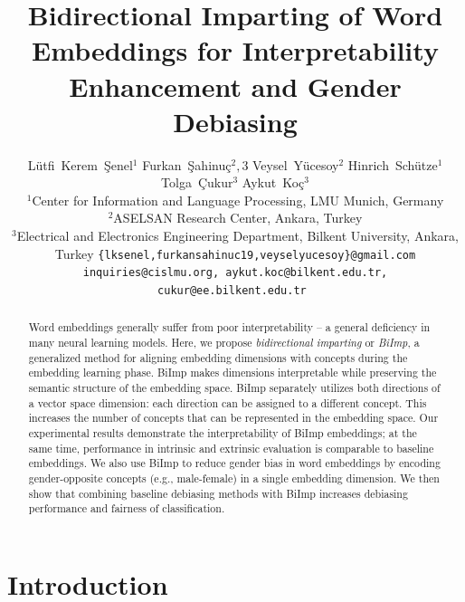 \documentclass[11pt,a4paper]{article}
\title{Bidirectional Imparting of Word Embeddings for Interpretability Enhancement and Gender Debiasing}
\author{Lütfi~Kerem~Şenel$^1$ \And Furkan~Şahinuç$^2,3$ \And Veysel~Yücesoy$^2$ \And Hinrich~Schütze$^1$ \And Tolga~Çukur$^3$ \And Aykut~Koç$^3$\\
  $^1$Center for Information and Language Processing, LMU Munich, Germany \\
  $^2$ASELSAN Research Center, Ankara, Turkey \\
  $^3$Electrical and Electronics Engineering Department, Bilkent University, Ankara, Turkey
  \texttt{\{lksenel,furkansahinuc19,veyselyucesoy\}@gmail.com}\\
  \texttt{inquiries@cislmu.org, aykut.koc@bilkent.edu.tr, cukur@ee.bilkent.edu.tr } \\}
\date{}
\def\proposedmethod{BiImp}
\begin{document}
\maketitle
\begin{abstract}
  Word embeddings
  generally suffer from poor interpretability -- a general
  deficiency in many neural learning models.
  Here, we propose \emph{bidirectional imparting} or
\emph{\proposedmethod}, a generalized method for aligning embedding
dimensions with concepts during the embedding learning
phase. \proposedmethod{} makes  dimensions interpretable
while preserving the semantic structure of the embedding space.
 \proposedmethod{} separately utilizes both directions of
 a vector space dimension: each direction can be assigned
 to a different concept. This increases the number of
 concepts that can be represented in the embedding space.
 Our experimental results demonstrate the interpretability
of \proposedmethod{} embeddings; at the same time,
performance in intrinsic and extrinsic evaluation is
comparable to baseline embeddings.
We also use \proposedmethod{} 
to reduce gender bias in word embeddings
by encoding gender-opposite concepts (e.g., male-female) in
a single embedding dimension.
We then show that combining 
baseline debiasing methods
with \proposedmethod{} increases debiasing performance and
fairness of classification.
\end{abstract}



\section{Introduction}\label{sec:intro}
\end{document}
